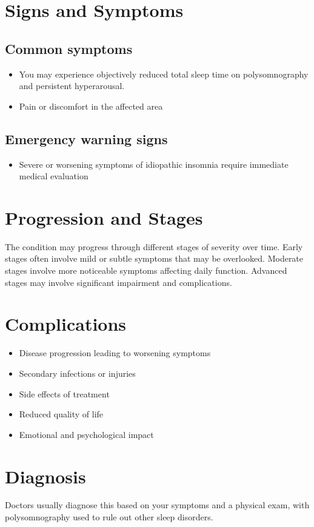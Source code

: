 \section{Signs and Symptoms}
\subsection{Common symptoms}
\begin{itemize}[noitemsep]
  \item You may experience objectively reduced total sleep time on polysomnography and persistent hyperarousal.
  \item Pain or discomfort in the affected area
  \end{itemize}
\subsection{Emergency warning signs}
\begin{itemize}[noitemsep]
  \item Severe or worsening symptoms of idiopathic insomnia require immediate medical evaluation
\end{itemize}
\section{Progression and Stages}
The condition may progress through different stages of severity over time. Early stages often involve mild or subtle symptoms that may be overlooked. Moderate stages involve more noticeable symptoms affecting daily function. Advanced stages may involve significant impairment and complications.
\section{Complications}
\begin{itemize}[noitemsep]
  \item Disease progression leading to worsening symptoms
  \item Secondary infections or injuries
  \item Side effects of treatment
  \item Reduced quality of life
  \item Emotional and psychological impact
\end{itemize}
\section{Diagnosis}
Doctors usually diagnose this based on your symptoms and a physical exam, with polysomnography used to rule out other sleep disorders.

